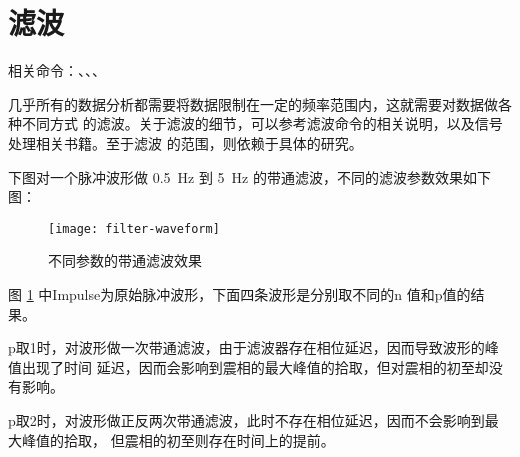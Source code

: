 \section{滤波}
相关命令：、、、

几乎所有的数据分析都需要将数据限制在一定的频率范围内，这就需要对数据做各种不同方式
的滤波。关于滤波的细节，可以参考滤波命令的相关说明，以及信号处理相关书籍。至于滤波
的范围，则依赖于具体的研究。

下图对一个脉冲波形做 \SI{0.5}{\Hz} 到 \SI{5}{\Hz} 的带通滤波，不同的滤波参数效果如下图：
\begin{figure}[H]
\centering
\texttt{[image: filter-waveform]}
\caption{不同参数的带通滤波效果}
\label{fig:filter-waveform}
\end{figure}
图 \ref{fig:filter-waveform} 中Impulse为原始脉冲波形，下面四条波形是分别取不同的n
值和p值的结果。

p取1时，对波形做一次带通滤波，由于滤波器存在相位延迟，因而导致波形的峰值出现了时间
延迟，因而会影响到震相的最大峰值的拾取，但对震相的初至却没有影响。

p取2时，对波形做正反两次带通滤波，此时不存在相位延迟，因而不会影响到最大峰值的拾取，
但震相的初至则存在时间上的提前。
